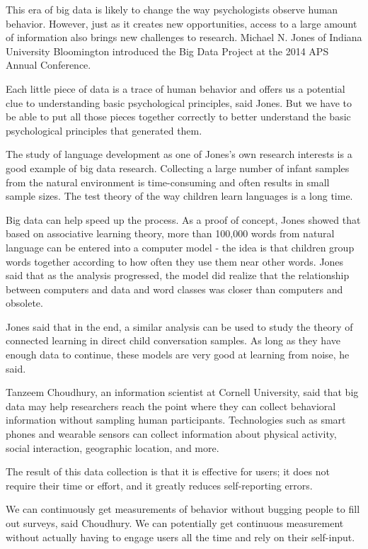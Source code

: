 This era of big data is likely to change the way psychologists observe 
human behavior. However, just as it creates new opportunities, access 
to a large amount of information also brings new challenges to research. 
Michael N. Jones of Indiana University Bloomington introduced the 
Big Data Project at the 2014 APS Annual Conference.

Each little piece of data is a trace of human behavior and offers 
us a potential clue to understanding basic psychological principles, 
said Jones. But we have to be able to put all those pieces together 
correctly to better understand the basic psychological principles 
that generated them\cite{editor00}.

The study of language development as one of Jones's own research interests 
is a good example of big data research. Collecting a large number of infant
samples from the natural environment is time-consuming and often results 
in small sample sizes. The test theory of the way children learn 
languages is a long time.

Big data can help speed up the process. As a proof of concept, Jones 
showed that based on associative learning theory, more than 100,000 
words from natural language can be entered into a computer model - the 
idea is that children group words together according to how often 
they use them near other words. Jones said that as the analysis progressed, 
the model did realize that the relationship between computers and data 
and word classes was closer than computers and obsolete.

Jones said that in the end, a similar analysis can be used to study 
the theory of connected learning in direct child conversation samples. 
As long as they have enough data to continue, these models are very 
good at learning from noise, he said\cite{editor00}.

Tanzeem Choudhury, an information scientist at Cornell University, 
said that big data may help researchers reach the point where they 
can collect behavioral information without sampling human participants. 
Technologies such as smart phones and wearable sensors can collect 
information about physical activity, social interaction, geographic 
location, and more\cite{editor00}.

The result of this data collection is that it is effective for users; 
it does not require their time or effort, and it greatly reduces 
self-reporting errors.

We can continuously get measurements of behavior without bugging 
people to fill out surveys, said Choudhury. We can potentially get 
continuous measurement without actually having to engage users all 
the time and rely on their self-input\cite{editor00}.

